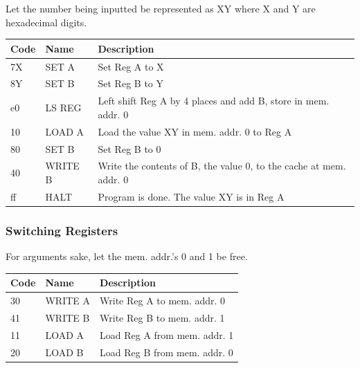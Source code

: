 \documentclass[12pt]{report}
\begin{document}
	Let the number being inputted be represented as XY where X and Y are hexadecimal digits.
	
	\FloatBarrier
	\begin{table}[!ht]
		\begin{tabular}{lll}
			Code 			& Name 				& Description \\ \hline
			7X 				& SET A 			& Set Reg A to X \\
			8Y 				& SET B 			& Set Reg B to Y \\
			e0 				& LS REG 			& Left shift Reg A by 4 places and add B, store in mem. addr. 0 \\
			10				& LOAD A			& Load the value XY in mem. addr. 0 to Reg A \\
			80				& SET B				& Set Reg B to 0 \\
			40				& WRITE B			& Write the contents of B, the value 0, to the cache at mem. addr. 0 \\
			ff				& HALT				& Program is done. The value XY is in Reg A \\
		\end{tabular}
	\end{table}
	\FloatBarrier
	
	\subsubsection{Switching Registers}
	
	For arguments sake, let the mem. addr.'s 0 and 1 be free.
		
	\FloatBarrier
	\begin{table}[!ht]
		\begin{tabular}{lll}
			Code 			& Name 				& Description \\ \hline
			30				& WRITE A			& Write Reg A to mem. addr. 0 \\	
			41				& WRITE B			& Write Reg B to mem. addr. 1 \\	
			11				& LOAD A			& Load Reg A from mem. addr. 1 \\	
			20				& LOAD B			& Load Reg B from mem. addr. 0 \\	
		\end{tabular}
	\end{table}
	\FloatBarrier
	
\end{document}
